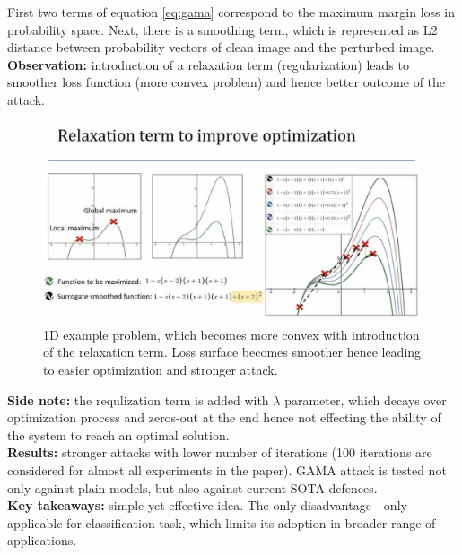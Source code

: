 First two terms of equation \ref{eq:gama} correspond to the maximum margin loss in probability space. Next, there is a smoothing term, which is represented as L2 distance between probability vectors of clean image and the perturbed image. \\

{\bf Observation:} introduction of a relaxation term (regularization) leads to smoother loss function (more convex problem) and hence better outcome of the attack. \\

\begin{figure}
  \centering
  \includegraphics[scale=0.3]{neurips-2020/images/Screenshot 2020-12-10 at 21.11.50.png}
  \caption{1D example problem, which becomes more convex with introduction of the relaxation term. Loss surface becomes smoother hence leading to easier optimization and stronger attack.}
\end{figure}

{\bf Side note:} the requlization term is added with $\lambda$ parameter, which decays over optimization process and zeros-out at the end hence not effecting the ability of the system to reach an optimal solution. \\

{\bf Results:} stronger attacks with lower number of iterations (100 iterations are considered for almost all experiments in the paper). GAMA attack is tested not only against plain models, but also against current SOTA defences. \\

{\bf Key takeaways:} simple yet effective idea. The only disadvantage - only applicable for classification task, which limits its adoption in broader range of applications. \\










